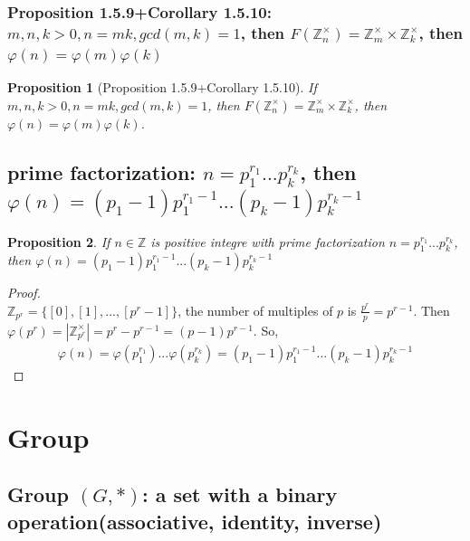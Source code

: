 \documentclass[11pt,a4paper]{article}
\newtheorem{proposition}{Proposition}
\begin{document}
\subsubsection{Proposition 1.5.9+Corollary 1.5.10: $m,n,k>0,n=mk,gcd(m,k)=1$, then $F(\mathbb{Z}_n^{\times})=\mathbb{Z}_m^{\times}\times\mathbb{Z}_k^{\times}$, then $\varphi(n)=\varphi(m)\varphi(k)$}
\begin{proposition}[Proposition 1.5.9+Corollary 1.5.10]
    If $m,n,k>0,n=mk,gcd(m,k)=1$, then $F(\mathbb{Z}_n^{\times})=\mathbb{Z}_m^{\times}\times\mathbb{Z}_k^{\times}$, then $\varphi(n)=\varphi(m)\varphi(k)$.
\end{proposition}

\subsection{prime factorization: $n=p_1^{r_1}...p_k^{r_k}$, then $\varphi(n)=(p_1-1)p_1^{r_1-1}...(p_k-1)p_k^{r_k-1}$}
\begin{proposition}
If $n\in\mathbb{Z}$ is positive integre with prime factorization $n=p_1^{r_1}...p_k^{r_k}$, then $\varphi(n)=(p_1-1)p_1^{r_1-1}...(p_k-1)p_k^{r_k-1}$
\end{proposition}
\begin{proof}
\quad\\
$\mathbb{Z}_{p^r}=\{[0],[1],...,[p^r-1]\}$, the number of multiples of $p$ is $\frac{p^r}{p}=p^{r-1}$. Then $\varphi(p^r)=|\mathbb{Z}_{p^r}^{\times}|=p^r-p^{r-1}=(p-1)p^{r-1}$. So,
\begin{equation}
    \begin{aligned}
        \varphi(n)=\varphi(p_1^{r_1})...\varphi(p_k^{r_k})=(p_1-1)p_1^{r_1-1}...(p_k-1)p_k^{r_k-1}
    \end{aligned}
    \nonumber
\end{equation}
\end{proof}







\section{Group}
\subsection{Group $(G, *)$: a set with a binary operation(associative, identity, inverse)}
\end{document}
